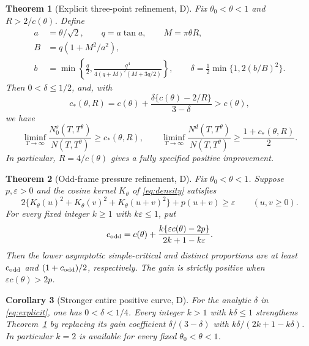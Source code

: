 ﻿\documentclass[11pt]{article}
\newtheorem{theorem}{Theorem}[section]
\newtheorem{corollary}[theorem]{Corollary}
\theoremstyle{remark}
\begin{document}
\begin{theorem}[Explicit three-point refinement, D]\label{thm:main}
Fix $\theta_0<\theta<1$ and $R>2/c(\theta)$. Define
\begin{equation}\label{eq:explicit}
\begin{aligned}
 a&=\theta/\sqrt2,\qquad q=a\tan a,\qquad M=\pi\theta R,\\
 B&=q(1+M^2/a^2),\\
 b&=\min\left\{\frac q2,
       \frac{q^4}{4(q+M)^2(M+3q/2)}\right\},\qquad
 \delta=\frac12\min\{1,2(b/B)^2\}.
\end{aligned}
\end{equation}
Then $0<\delta\le1/2$, and, with
\begin{equation}\label{eq:cstar}
 c_*(\theta,R)=c(\theta)
       +\frac{\delta\{c(\theta)-2/R\}}{3-\delta}>c(\theta),
\end{equation}
we have
\begin{equation}\label{eq:mainbounds}
 \liminf_{T\to\infty}\frac{N_0^s(T,T^\theta)}{N(T,T^\theta)}
 \ge c_*(\theta,R),\qquad
 \liminf_{T\to\infty}\frac{N^d(T,T^\theta)}{N(T,T^\theta)}
 \ge\frac{1+c_*(\theta,R)}2.
\end{equation}
In particular, $R=4/c(\theta)$ gives a fully specified positive improvement.
\end{theorem}

\begin{theorem}[Odd-frame pressure refinement, D]\label{thm:pressure}
Fix $\theta_0<\theta<1$. Suppose $p,\varepsilon>0$ and the cosine kernel
$K_\theta$ of \eqref{eq:density} satisfies
\begin{equation}\label{eq:pressure}
 2\{K_\theta(u)^2+K_\theta(v)^2+K_\theta(u+v)^2\}
 +p(u+v)\ge\varepsilon\qquad(u,v\ge0).
\end{equation}
For every fixed integer $k\ge1$ with $k\varepsilon\le1$, put
\begin{equation}\label{eq:pressureconstant}
 c_{\rm odd}=c(\theta)+
 \frac{k\{\varepsilon c(\theta)-2p\}}{2k+1-k\varepsilon}.
\end{equation}
Then the lower asymptotic simple-critical and distinct proportions are at
least $c_{\rm odd}$ and $(1+c_{\rm odd})/2$, respectively. The gain is
strictly positive when $\varepsilon c(\theta)>2p$.
\end{theorem}

\begin{corollary}[Stronger entire positive curve, D]\label{cor:wholecurve}
For the analytic $\delta$ in \eqref{eq:explicit}, one has $0<\delta<1/4$.
Every integer $k>1$ with $k\delta\le1$ strengthens
Theorem~\ref{thm:main} by replacing its gain coefficient
$\delta/(3-\delta)$ with $k\delta/(2k+1-k\delta)$. In particular $k=2$
is available for every fixed $\theta_0<\theta<1$.
\end{corollary}
\end{document}
